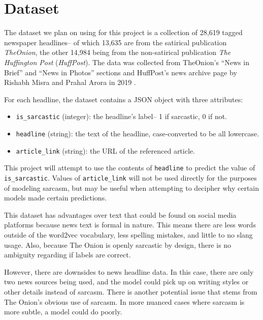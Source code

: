 \documentclass[11pt]{article}
\begin{document}
\section{Dataset}

The dataset we plan on using for this project is a collection of 28,619 tagged
newspaper headlines-- of which 13,635 are from the satirical publication
\textit{TheOnion}, the other 14,984 being from the non-satirical publication
\textit{The Huffington Post} (\textit{HuffPost}). The data was collected from
TheOnion's ``News in Brief'' and ``News in Photos'' sections and HuffPost's
news archive page by Rishabh Misra and Prahal Arora in 2019
\cite{misra2023Sarcasm}.

For each headline, the dataset contains a JSON object with three attributes:
\begin{itemize}
    \item \texttt{is\_sarcastic} (integer): the headline's label-- 1 if
        sarcastic, 0 if not.
    \item \texttt{headline} (string): the text of the headline, case-converted
        to be all lowercase.
    \item \texttt{article\_link} (string): the URL of the referenced article.
\end{itemize}

This project will attempt to use the contents of \texttt{headline} to predict
the value of \texttt{is\_sarcastic}. Values of \texttt{article\_link} will not
be used directly for the purposes of modeling sarcasm, but may be useful when
attempting to decipher why certain models made certain predictions.

This dataset has advantages over text that could be found on social media
platforms because news text is formal in nature. This means there are less
words outside of the word2vec vocabulary, less spelling mistakes, and little to
no slang usage. Also, because The Onion is openly sarcastic by design, there is
no ambiguity regarding if labels are correct.

However, there are downsides to news headline data. In this case, there are
only two news sources being used, and the model could pick up on writing styles
or other details instead of sarcasm. There is another potential issue that
stems from The Onion's obvious use of sarcasm. In more nuanced cases where
sarcasm is more subtle, a model could do poorly.
\end{document}
